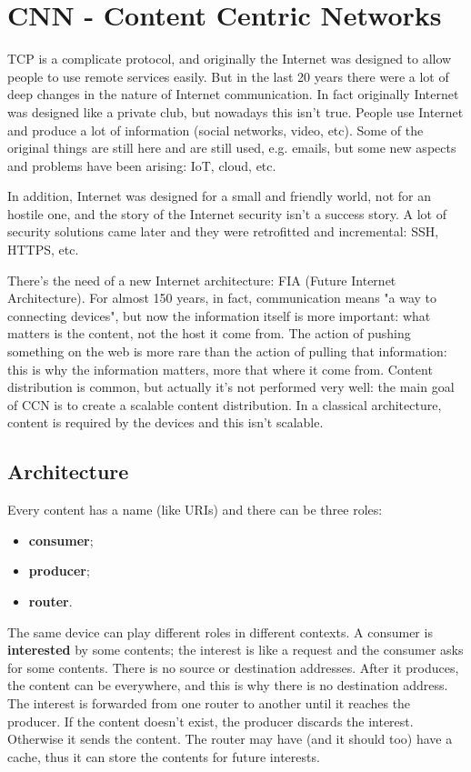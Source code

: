 \section{CNN - Content Centric Networks}
TCP is a complicate protocol, and originally the Internet was designed to allow
people to use remote services easily. But in the last 20 years there were a lot
of deep changes in the nature of Internet communication. In fact originally
Internet was designed like a private club, but nowadays this isn't true. People
use Internet and produce a lot of information (social networks, video, etc).
Some of the original things are still here and are still used, e.g. emails, but
some new aspects and problems have been arising: IoT, cloud, etc.

In addition, Internet was designed for a small and friendly world, not for an
hostile one, and the story of the Internet security isn't a success story. A
lot of security solutions came later and they were retrofitted and incremental:
SSH, HTTPS, etc.

There's the need of a new Internet architecture: FIA (Future Internet
Architecture). For almost 150 years, in fact, communication means "a way to
connecting devices", but now the information itself is more important: what
matters is the content, not the host it come from. The action of pushing
something on the web is more rare than the action of pulling that information:
this is why the information matters, more that where it come from. Content
distribution is common, but actually it's not performed very well: the main goal
of CCN is to create a scalable content distribution. In a classical
architecture, content is required by the devices and this isn't scalable.

\subsection{Architecture}
Every content has a name (like URIs) and there can be three roles:
\begin{itemize}
  \item \textbf{consumer};
  \item \textbf{producer};
  \item \textbf{router}.
\end{itemize}
The same device can play different roles in different contexts. A consumer is
\textbf{interested} by some contents; the interest is like a request and the
consumer asks for some contents. There is no source or destination addresses.
After it produces, the content can be everywhere, and this is why there is
no destination address. The interest is forwarded from one router to another
until it reaches the producer. If the content doesn't exist, the producer
discards the interest. Otherwise it sends the content. The router may have (and
it should too) have a cache, thus it can store the contents for future
interests.
